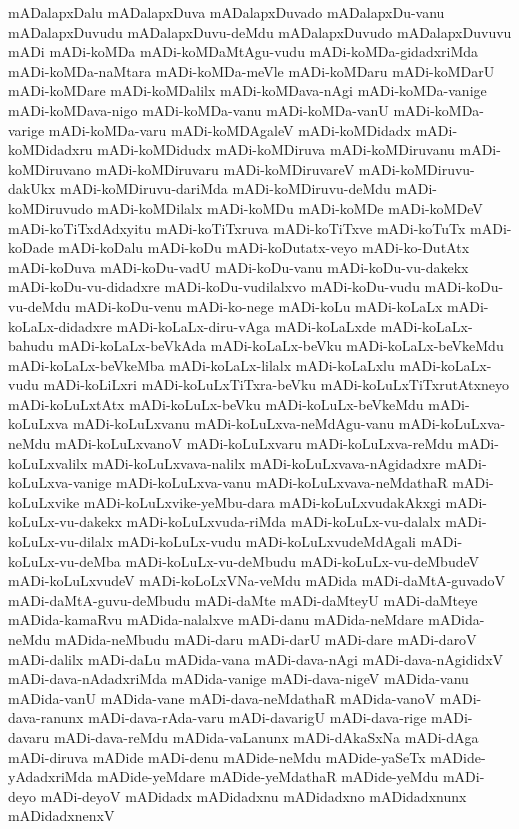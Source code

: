 {mADalapxDalu
mADalapxDuva
mADalapxDuvado
mADalapxDu-vanu
mADalapxDuvudu
mADalapxDuvu-deMdu
mADalapxDuvudo
mADalapxDuvuvu
mADi
mADi-koMDa
mADi-koMDaMtAgu-vudu
mADi-koMDa-gidadxriMda
mADi-koMDa-naMtara
mADi-koMDa-meVle
mADi-koMDaru
mADi-koMDarU
mADi-koMDare
mADi-koMDalilx
mADi-koMDava-nAgi
mADi-koMDa-vanige
mADi-koMDava-nigo
mADi-koMDa-vanu
mADi-koMDa-vanU
mADi-koMDa-varige
mADi-koMDa-varu
mADi-koMDAgaleV
mADi-koMDidadx
mADi-koMDidadxru
mADi-koMDidudx
mADi-koMDiruva
mADi-koMDiruvanu
mADi-koMDiruvano
mADi-koMDiruvaru
mADi-koMDiruvareV
mADi-koMDiruvu-dakUkx
mADi-koMDiruvu-dariMda
mADi-koMDiruvu-deMdu
mADi-koMDiruvudo
mADi-koMDilalx
mADi-koMDu
mADi-koMDe
mADi-koMDeV
mADi-koTiTxdAdxyitu
mADi-koTiTxruva
mADi-koTiTxve
mADi-koTuTx
mADi-koDade
mADi-koDalu
mADi-koDu
mADi-koDutatx-veyo
mADi-ko-DutAtx
mADi-koDuva
mADi-koDu-vadU
mADi-koDu-vanu
mADi-koDu-vu-dakekx
mADi-koDu-vu-didadxre
mADi-koDu-vudilalxvo
mADi-koDu-vudu
mADi-koDu-vu-deMdu
mADi-koDu-venu
mADi-ko-nege
mADi-koLu
mADi-koLaLx
mADi-koLaLx-didadxre
mADi-koLaLx-diru-vAga
mADi-koLaLxde
mADi-koLaLx-bahudu
mADi-koLaLx-beVkAda
mADi-koLaLx-beVku
mADi-koLaLx-beVkeMdu
mADi-koLaLx-beVkeMba
mADi-koLaLx-lilalx
mADi-koLaLxlu
mADi-koLaLx-vudu
mADi-koLiLxri
mADi-koLuLxTiTxra-beVku
mADi-koLuLxTiTxrutAtxneyo
mADi-koLuLxtAtx
mADi-koLuLx-beVku
mADi-koLuLx-beVkeMdu
mADi-koLuLxva
mADi-koLuLxvanu
mADi-koLuLxva-neMdAgu-vanu
mADi-koLuLxva-neMdu
mADi-koLuLxvanoV
mADi-koLuLxvaru
mADi-koLuLxva-reMdu
mADi-koLuLxvalilx
mADi-koLuLxvava-nalilx
mADi-koLuLxvava-nAgidadxre
mADi-koLuLxva-vanige
mADi-koLuLxva-vanu
mADi-koLuLxvava-neMdathaR
mADi-koLuLxvike
mADi-koLuLxvike-yeMbu-dara
mADi-koLuLxvudakAkxgi
mADi-koLuLx-vu-dakekx
mADi-koLuLxvuda-riMda
mADi-koLuLx-vu-dalalx
mADi-koLuLx-vu-dilalx
mADi-koLuLx-vudu
mADi-koLuLxvudeMdAgali
mADi-koLuLx-vu-deMba
mADi-koLuLx-vu-deMbudu
mADi-koLuLx-vu-deMbudeV
mADi-koLuLxvudeV
mADi-koLoLxVNa-veMdu
mADida
mADi-daMtA-guvadoV
mADi-daMtA-guvu-deMbudu
mADi-daMte
mADi-daMteyU
mADi-daMteye
mADida-kamaRvu
mADida-nalalxve
mADi-danu
mADida-neMdare
mADida-neMdu
mADida-neMbudu
mADi-daru
mADi-darU
mADi-dare
mADi-daroV
mADi-dalilx
mADi-daLu
mADida-vana
mADi-dava-nAgi
mADi-dava-nAgididxV
mADi-dava-nAdadxriMda
mADida-vanige
mADi-dava-nigeV
mADida-vanu
mADida-vanU
mADida-vane
mADi-dava-neMdathaR
mADida-vanoV
mADi-dava-ranunx
mADi-dava-rAda-varu
mADi-davarigU
mADi-dava-rige
mADi-davaru
mADi-dava-reMdu
mADida-vaLanunx
mADi-dAkaSxNa
mADi-dAga
mADi-diruva
mADide
mADi-denu
mADide-neMdu
mADide-yaSeTx
mADide-yAdadxriMda
mADide-yeMdare
mADide-yeMdathaR
mADide-yeMdu
mADi-deyo
mADi-deyoV
mADidadx
mADidadxnu
mADidadxno
mADidadxnunx
mADidadxnenxV
}
